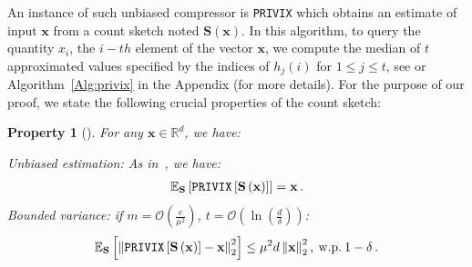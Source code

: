 \documentclass[twoside]{article}
\newtheorem{property}{Property}
\begin{document}
An instance of such unbiased compressor is \texttt{PRIVIX} which obtains an estimate of input $\boldsymbol{x}$ from a count sketch noted $\boldsymbol{S}(\boldsymbol{x})$. 
In this algorithm, to query the quantity $x_i$, the $i-th$ element of the vector $\boldsymbol{x}$, we compute the median of $t$ approximated values specified by the indices of $h_j(i)$ for $1\leq j\leq t$, see \cite{li2019privacy} or Algorithm~\ref{Alg:privix} in the Appendix (for more details).
For the purpose of our proof, we state the following crucial properties of the count sketch:
\begin{property}[\cite{li2019privacy}]
For any $\mathbf{x}\in \mathbb{R}^{d}$, we have:

\emph{Unbiased estimation}: As in~\cite{li2019privacy}, we have:
    \begin{align}\notag
        \mathbb{E}_{\mathbf{S}}\left[\texttt{PRIVIX}\left[\mathbf{S}\left(\mathbf{x}\right)\right]\right]=\mathbf{x}\, .
    \end{align}
\emph{Bounded variance:} if $m=\mathcal{O}\left(\frac{e}{\mu^2}\right)$, $t=\mathcal{O}\left(\ln \left(\frac{d}{\delta}\right)\right)$:
    \begin{align}\notag
        \mathbb{E}_{\mathbf{S}}\left[\left\|\texttt{PRIVIX}\left[\mathbf{S}\left(\mathbf{x}\right)\right]-\mathbf{x}\right\|_2^2\right]\leq \mu^2 d\left\|\mathbf{x}\right\|_2^2, \: \textrm{w.p.} \: 1-\delta \, . 
    \end{align}

\end{property}
\end{document}
